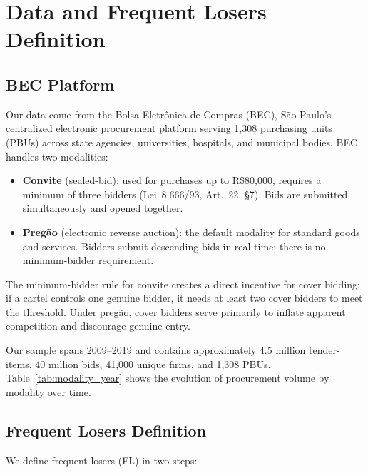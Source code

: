 \section{Data and Frequent Losers Definition}
\label{sec:data}

\subsection{BEC Platform}

Our data come from the Bolsa Eletr\^onica de Compras (BEC), S\~ao
Paulo's centralized electronic procurement platform serving 1,308
purchasing units (PBUs) across state agencies, universities, hospitals,
and municipal bodies. BEC handles two modalities:

\begin{itemize}
  \item \textbf{Convite} (sealed-bid): used for purchases up to
    R\$80,000, requires a minimum of three bidders (Lei~8.666/93,
    Art.~22, \S7). Bids are submitted simultaneously and opened together.
  \item \textbf{Preg\~ao} (electronic reverse auction): the default
    modality for standard goods and services. Bidders submit descending
    bids in real time; there is no minimum-bidder requirement.
\end{itemize}

The minimum-bidder rule for convite creates a direct incentive for cover
bidding: if a cartel controls one genuine bidder, it needs at least two
cover bidders to meet the threshold. Under preg\~ao, cover bidders serve
primarily to inflate apparent competition and discourage genuine entry.

Our sample spans 2009--2019 and contains approximately 4.5 million
tender-items, 40 million bids, 41,000 unique firms, and 1,308 PBUs.
Table~\ref{tab:modality_year} shows the evolution of procurement volume
by modality over time.



\subsection{Frequent Losers Definition}

We define frequent losers (FL) in two steps:

